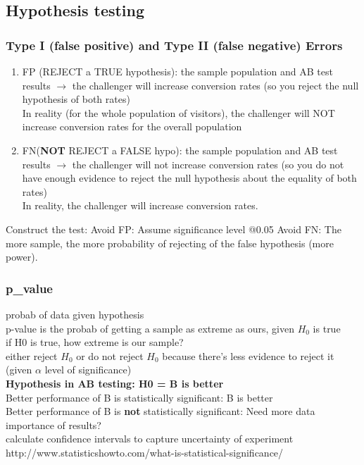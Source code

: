 \documentclass{beamer}
\begin{document}
\subsection{Hypothesis testing}

\begin{frame}\frametitle{Type I (false positive)  and Type II (false negative) Errors}
	\begin{enumerate}
		\item FP (REJECT a TRUE hypothesis): the sample population and AB test results $\rightarrow$ the challenger will increase conversion rates (so you reject the null hypothesis of both rates)\\
		In reality (for the whole population of visitors), the challenger will NOT increase conversion rates for the overall population
		\item FN(\textbf{NOT} REJECT a FALSE hypo): the sample population and AB test results $\rightarrow$ the challenger will not increase conversion rates (so you do not have enough evidence to reject the null hypothesis about the equality of both rates)\\
		In reality, the challenger will increase conversion rates.
	\end{enumerate}
Construct the test:
Avoid FP: Assume significance level @0.05
Avoid FN: The more sample, the more probability of rejecting of the false hypothesis (more power).
\end{frame}

\begin{frame}\frametitle{p\_value}
probab of data given hypothesis\\
p-value is the probab of getting a sample as extreme as ours, given $H_0$ is true\\
if H0 is true, how extreme is our sample?\\
either reject $H_0$ or do not reject $H_0$ because there's less evidence to reject it (given $\alpha$ level of significance)\\
\textbf{Hypothesis in AB testing: H0 = B is better}\\
Better performance of B is statistically significant: B is better\\
Better performance of B is \textbf{not} statistically significant: Need more data\\

importance of results?\\
calculate confidence intervals to capture uncertainty of experiment\\
	
http://www.statisticshowto.com/what-is-statistical-significance/


\end{frame}
\end{document}
